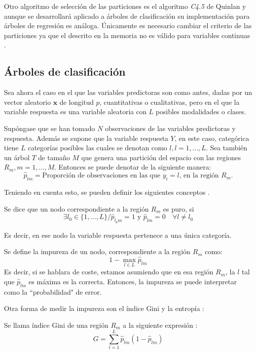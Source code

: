 \noindent Otro algoritmo de selección de las particiones es el algoritmo \emph{C4.5} de Quinlan y aunque se desarrollará aplicado a árboles de clasificación su implementación para árboles de regresión es análoga.  Únicamente es necesario cambiar el criterio de las particiones ya que el descrito en la memoria no es válido para variables continuas \cite{Quinlan 2014}. 

\subsection{Árboles de clasificación}

\noindent Sea ahora el caso en el que las variables predictoras son como antes, dadas por un vector aleatorio $\mathbf{x}$ de longitud $p$, cuantitativas o cualitativas, pero en el que la variable respuesta es una variable aleatoria con $L$ posibles modalidades o clases.

\noindent Supóngase que se han tomado $N$ observaciones de las variables predictoras y respuesta. Además se supone que la variable respuesta $Y$, en este caso, categórica tiene $L$ categorías posibles las cuales se denotan como $l, l=1,\ldots,L$. Sea también un árbol $T$ de tamaño $M$ que genera una partición del espacio con las regiones $R_m, m=1,\ldots, M$. Entonces se puede denotar de la siguiente manera: 
\begin{equation}
\hat{p}_{lm}=\text{Proporción de observaciones en las que $y_i=l$, en la región $R_m$.}
\end{equation}

\noindent Teniendo en cuenta esto, se pueden definir los siguientes conceptos \cite{ Brown 2004, Divakaran 2022, Hastie 2001, James 2013}.
\begin{defi}
Se dice que un nodo correspondiente a la región $R_m$ es puro, si 
\begin{equation}
\exists l_0\in \lbrace 1,\ldots, L\rbrace/ \hat{p}_{l_0 m}=1 \text{ y }\hat{p}_{lm}=0 \quad \forall l\neq l_0 
\end{equation}

\noindent Es decir, en ese nodo la variable respuesta pertenece a una única categoría. 
\end{defi}

\begin{defi}
Se define la impureza de un nodo, correspondiente a la región $R_m$ como:
\begin{equation}
1-\max_{l\in L} \hat{p}_{lm}
\end{equation}
\noindent Es decir, si se hablara de coste, estamos asumiendo que en esa región $R_m$, la $l$ tal que $\hat{p}_{lm}$ es máxima es la correcta. Entonces, la impureza se puede interpretar como la ``probabilidad" de error. 
\end{defi}
\noindent Otra forma de medir la impureza son el índice Gini y la entropía \cite{Hastie 2001, Divakaran 2022, James 2013}:
\begin{defi}
Se llama índice Gini de una región $R_m$ a la siguiente expresión :
\begin{equation}
G=\sum_{l=1}^L\hat{p}_{lm}(1-\hat{p}_{lm})
\end{equation}
\end{defi} 

